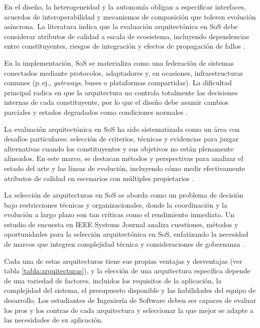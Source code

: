			En el diseño, la heterogeneidad y la autonomía obligan a especificar interfaces, acuerdos de interoperabilidad y mecanismos de composición que toleren evolución asíncrona. La literatura indica que la evaluación arquitectónica en SoS debe considerar atributos de calidad a escala de ecosistema, incluyendo dependencias entre constituyentes, riesgos de integración y efectos de propagación de fallos \cite{SantosEtAl2022CSUR}.
			
			En la implementación, SoS se materializa como una federación de sistemas conectados mediante protocolos, adaptadores y, en ocasiones, infraestructuras comunes (p.\,ej., \textit{gateways}, buses o plataformas compartidas). La dificultad principal radica en que la arquitectura no controla totalmente las decisiones internas de cada constituyente, por lo que el diseño debe asumir cambios parciales y estados degradados como condiciones normales \cite{SantosEtAl2022CSUR,Fang2022JSyst}.
			
			La evaluación arquitectónica en SoS ha sido sistematizada como un área con desafíos particulares: selección de criterios, técnicas y evidencias para juzgar alternativas cuando los constituyentes y sus objetivos no están plenamente alineados. En este marco, se destacan métodos y perspectivas para analizar el estado del arte y las líneas de evolución, incluyendo cómo medir efectivamente atributos de calidad en escenarios con múltiples propietarios \cite{SantosEtAl2022CSUR}.
			
			La selección de arquitecturas en SoS se aborda como un problema de decisión bajo restricciones técnicas y organizacionales, donde la coordinación y la evolución a largo plazo son tan críticas como el rendimiento inmediato. Un estudio de encuesta en IEEE Systems Journal analiza cuestiones, métodos y oportunidades para la selección arquitectónica en SoS, enfatizando la necesidad de marcos que integren complejidad técnica y consideraciones de gobernanza \cite{Fang2022JSyst}.
			
			
			
Cada una de estas arquitecturas tiene sus propias ventajas y desventajas (ver tabla \ref{tabla:arquitecturas}), y la elección de una arquitectura específica depende de una variedad de factores, incluidos los requisitos de la aplicación, la complejidad del sistema, el presupuesto disponible y las habilidades del equipo de desarrollo. Los estudiantes de Ingeniería de Software deben ser capaces de evaluar los pros y los contras de cada arquitectura y seleccionar la que mejor se adapte a las necesidades de su aplicación.

